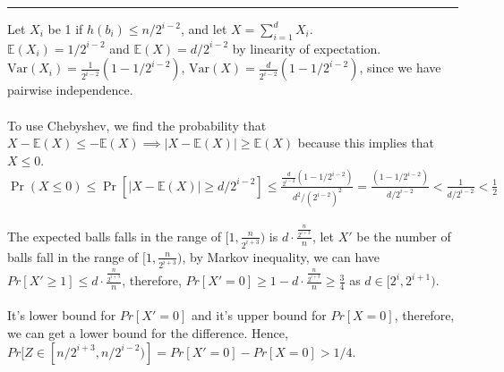\documentclass[11pt]{article}
\begin{document}




\begin{quote}

\end{quote}
\hrule
\begin{solution}
    \item Let $X_i$ be 1 if $h(b_i) \leq n/2^{i-2}$, and let $X = \sum_{i=1}^{d}X_i$. \\
    $\mathbb{E}(X_i) = 1/2^{i-2}$ and $\mathbb{E}(X) = d/2^{i-2}$ by linearity of expectation.\\
    $\mathrm{Var}(X_i) = \frac{1}{2^{i-2}}(1 - 1/2^{i-2})$,  $\mathrm{Var}(X) = \frac{d}{2^{i-2}}(1 - 1/2^{i-2})$, since we have pairwise independence. \\ 
    \\
    To use Chebyshev, we find the probability that $X - \mathbb{E}(X) \leq - \mathbb{E}(X) \implies |X - \mathbb{E}(X)| \geq  \mathbb{E}(X) $ because this implies that $X \leq 0$. \\
    
    $\Pr(X \leq 0 ) \leq \Pr[|X - \mathbb{E}(X)| \geq d/2^{i-2}] \leq \frac{\frac{d}{2^{i-2}}(1 - 1/2^{i-2})}{d^2/(2^{i-2})^2} = \frac{(1 - 1/2^{i-2})}{ d/2^{i-2}} < \frac{1}{d/2^{i-2}} < \frac{1}{2} $\\
    \\
    The expected balls falls in the range of $[1,\frac{n}{2^{i+3}})$ is $d \cdot \frac{\frac{n}{2^{i+3}}}{n}$, let $X'$ be the number of balls fall in the range of $[1,\frac{n}{2^{i+3}})$, by Markov inequality, we can have $Pr[X' \geq 1] \leq d \cdot \frac{\frac{n}{2^{i+3}}}{n}$, therefore, $Pr[X' = 0] \geq 1 - d \cdot \frac{\frac{n}{2^{i+3}}}{n} \geq \frac{3}{4}$ as $d \in [2^i, 2^{i+1})$.\\
    \\
    It's lower bound for $Pr[X'=0]$ and it's upper bound for $Pr[X=0]$, therefore, we can get a lower bound for the difference. Hence, $Pr[Z \in [n/2^{i+3}, n/2^{i-2})] = Pr[X' = 0] - Pr[X = 0] > 1/4$.
    
\end{solution}
\end{document}
